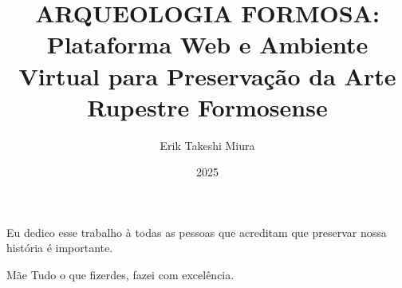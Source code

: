 \documentclass[pt,twoside,onehalfspacing,bsc]{ifgtcc}
\title{
ARQUEOLOGIA FORMOSA:
Plataforma Web e Ambiente Virtual para 
Preservação da Arte Rupestre Formosense 
}
\date{2025}
\author{Erik Takeshi Miura}
\begin{document}
\frontmatter
\frontpage
\presentationpage

\begin{fichacatalografica}
\FakeFichaCatalografica %
%
\end{fichacatalografica}

\begin{dedicatory}
Eu dedico esse trabalho à todas as pessoas que acreditam que preservar nossa história é importante.
\end{dedicatory}

\acknowledgements

\begin{epigraph}[]{Mãe}
Tudo o que fizerdes, fazei com excelência.
\end{epigraph}

\resumo


\abstract


\tableofcontents

\listoffigures
{}
\listoftables
{}
%  


\printglossary[type=\acronymtype, title={Acrônimos}] %


\mainmatter








\begin{references}

\end{references}

\theappendix

\end{document}
